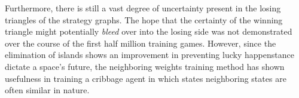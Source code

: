 Furthermore,
there is still a vast degree of uncertainty present in the losing triangles of
the strategy graphs.
%
The hope that the certainty of the winning triangle might potentially
\textit{bleed} over into the losing side was not demonstrated over the course of
the first half million training games.
%
However,
since the elimination of islands shows an improvement in
preventing lucky happenstance dictate a space's future,
the neighboring weights training method has shown usefulness in training a
cribbage agent in which states neighboring states are often similar in nature.


